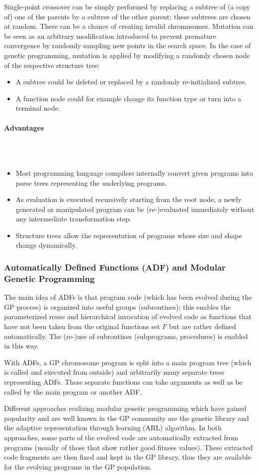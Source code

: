 \documentclass[12pt]{article}
\newcommand{\myparagraph}[1]{\paragraph{#1}\mbox{}\\\\}
\begin{document}
Single-point crossover can be simply performed by replacing a subtree of (a copy of) one of the parents by a subtree of the other parent; these subtrees are chosen at random. There can be a chance of creating invalid chromosomes. Mutation can be seen as an arbitrary modification introduced to prevent premature convergence by randomly sampling new points in the search space. In the case of genetic programming, mutation is applied by modifying a randomly chosen node of the respective structure tree:
\begin{itemize}
\item A subtree could be deleted or replaced by a randomly re-initialized subtree.
\item A function node could for example change its function type or turn into a terminal node.
\end{itemize}
\myparagraph{Advantages}
\begin{itemize}
\item Most programming language compilers internally convert given programs into parse trees representing the underlying programs.
\item As evaluation is executed recursively starting from the root node, a newly generated or manipulated program can be (re-)evaluated immediately without any intermediate transformation step.
\item Structure trees allow the representation of programs whose size and shape change dynamically.
\end{itemize}
\subsubsection{Automatically Defined Functions (ADF) and Modular Genetic Programming}
The main idea of ADFs is that program code (which has been evolved during the GP process) is organized into useful groups (subroutines); this enables the parameterized reuse and hierarchical invocation of evolved code as functions that have not been taken from the original functions set $F$ but are rather defined automatically. The (re-)use of subroutines (subprograms, procedures) is enabled in this way.

With ADFs, a GP chromosome program is split into a main program tree (which is called and executed from outside) and arbitrarily many separate trees representing ADFs. These separate functions can take arguments as well as be called by the main program or another ADF.

Different approaches realizing modular genetic programming which have gained popularity and are well known in the GP community are the genetic library and the adaptive representation through learning (ARL) algorithm. In both approaches, some parts of the evolved code are automatically extracted from programs (usually of those that show rather good fitness values). These extracted code fragments are then fixed and kept in the GP library, thus they are available for the evolving programs in the GP population.
\end{document}
